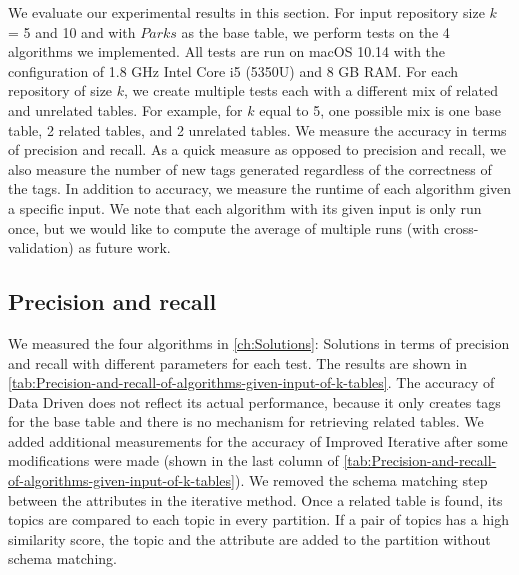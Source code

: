We evaluate our experimental results in this section. For input repository size $k$ = 5 and 10 and with $Parks$ as the base table, we perform tests on the 4 algorithms we implemented. All tests are run on macOS 10.14 with the configuration of 1.8 GHz Intel Core i5 (5350U) and 8 GB RAM. For each repository of size $k$, we create multiple tests each with a different mix of related and unrelated tables. For example, for $k$ equal to 5, one possible mix is one base table, 2 related tables, and 2 unrelated tables. We measure the accuracy in terms of precision and recall. As a quick measure as opposed to precision and recall, we also measure the number of new tags generated regardless of the correctness of the tags. In addition to accuracy, we measure the runtime of each algorithm given a specific input. We note that each algorithm with its given input is only run once, but we would like to compute the average of multiple runs (with cross-validation) as future work.

\subsection{Precision and recall}

We measured the four algorithms in \autoref{ch:Solutions}: Solutions in terms of precision and recall with different parameters for each test. The results are shown in \autoref{tab:Precision-and-recall-of-algorithms-given-input-of-k-tables}. The accuracy of Data Driven does not reflect its actual performance, because it only creates tags for the base table and there is no mechanism for retrieving related tables. We added additional measurements for the accuracy of Improved Iterative after some modifications were made (shown in the last column of \autoref{tab:Precision-and-recall-of-algorithms-given-input-of-k-tables}). We removed the schema matching step between the attributes in the iterative method. Once a related table is found, its topics are compared to each topic in every partition. If a pair of topics has a high similarity score, the topic and the attribute are added to the partition without schema matching.


